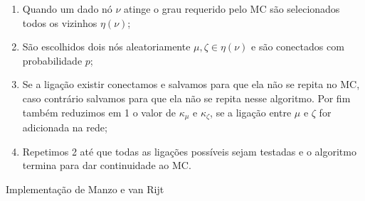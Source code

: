 \begin{enumerate}
  \item Quando um dado nó 
  $\nu$
   atinge o grau requerido pelo MC são selecionados todos os vizinhos 
    $\eta(\nu)$;
    
  \item São escolhidos dois nós aleatoriamente
  $\mu,\zeta\in \eta(\nu)$ 
  e são conectados com probabilidade $p$;
  \item Se a ligação existir conectamos e salvamos para que ela não se repita no MC, caso contrário salvamos para que ela não se repita nesse algoritmo. Por fim também reduzimos em 1 o valor de $\kappa_\mu$ e $\kappa_\zeta$,
se a ligação entre $\mu$ e $\zeta$ for adicionada na rede;
  \item Repetimos 2 até que todas as ligações possíveis sejam testadas e o algoritmo termina para dar continuidade ao MC.
\end{enumerate}

\begin{algorithm}[htbp]
   \caption{Implementação de Manzo e van Rijt}
   \label{alg:manzo}

\end{algorithm}



